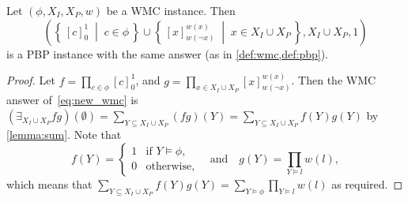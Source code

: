 \begin{proposition}\label{prop:equivalence}
  Let $(\phi, X_I, X_P, w)$ be a WMC instance. Then
  \begin{equation}
  \left( \left\{\, {[c]}_0^1 \;\middle|\; c \in \phi \,\right\} \cup \left\{\, {[x]}_{w(\neg x)}^{w(x)} \;\middle|\; x \in X_I \cup X_P \,\right\}, X_I \cup X_P, 1 \right) \label{eq:new_wmc}
  \end{equation}
  is a PBP instance with the same answer (as in \cref{def:wmc,def:pbp}).
\end{proposition}
\begin{proof}
  Let $f = \prod_{c \in \phi} {[c]}_0^1$, and
  $g = \prod_{x \in X_I \cup X_P} {[x]}_{w(\neg x)}^{w(x)}$. Then the WMC answer
  of~\eqref{eq:new_wmc} is
  $(\exists_{X_I \cup X_P} fg)(\emptyset) = \sum_{Y \subseteq X_I \cup X_P} (fg)(Y) = \sum_{Y \subseteq X_I \cup X_P} f(Y)g(Y)$
  by \cref{lemma:sum}. Note that
  \[
    f(Y) =
    \begin{cases}
      1 & \text{if } Y \models \phi, \\
      0 & \text{otherwise},
    \end{cases}
    \quad
    \text{and}
    \quad
    g(Y) = \prod_{Y \models l} w(l),
  \]
  which means that
  $\sum_{Y \subseteq X_I \cup X_P} f(Y)g(Y) = \sum_{Y \models \phi} \prod_{Y \models l} w(l)$
  as required.
\end{proof}

